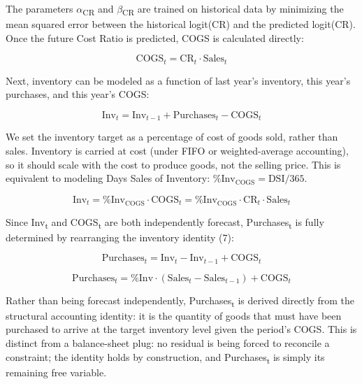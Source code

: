 \documentclass[12pt,a4paper]{article}
\begin{document}
The parameters $\alpha$\textsubscript{CR} and $\beta$\textsubscript{CR} are trained
on historical data by minimizing the mean squared error between the
historical logit(CR) and the predicted logit(CR). Once the future Cost
Ratio is predicted, COGS is calculated directly:

\begin{equation}\label{eq:cogs}
\text{COGS}_t = \text{CR}_t \cdot \text{Sales}_t
\end{equation}

Next, inventory can be modeled as a function of last year's inventory,
this year's purchases, and this year's COGS:

\begin{equation}\label{eq:inventory_rollforward}
\text{Inv}_t = \text{Inv}_{t-1} + \text{Purchases}_t - \text{COGS}_t
\end{equation}

We set the inventory target as a percentage of cost of goods sold, rather than sales. Inventory is carried at cost (under FIFO or weighted-average accounting), so it should scale with the cost to produce goods, not the selling price. This is equivalent to modeling Days Sales of Inventory: $\text{\%Inv}_{\text{COGS}} = \text{DSI} / 365$.

\begin{equation}\label{eq:inventory_target}
\text{Inv}_t = \text{\%Inv}_{\text{COGS}} \cdot \text{COGS}_t = \text{\%Inv}_{\text{COGS}} \cdot \text{CR}_t \cdot \text{Sales}_t
\end{equation}

Since Inv\textsubscript{t} and COGS\textsubscript{t} are both independently forecast, Purchases\textsubscript{t} is fully determined by rearranging the inventory identity (7):

\begin{equation}\label{eq:purchases}
\text{Purchases}_t = \text{Inv}_t - \text{Inv}_{t-1} + \text{COGS}_t
\end{equation}

\begin{equation}\label{eq:purchases_expanded}
\text{Purchases}_t = \text{\%Inv} \cdot (\text{Sales}_t - \text{Sales}_{t-1}) + \text{COGS}_t
\end{equation}

Rather than being forecast independently, Purchases\textsubscript{t} is derived directly from the structural accounting identity: it is the quantity of goods that must have been purchased to arrive at the target inventory level given the period's COGS. This is distinct from a balance-sheet plug: no residual is being forced to reconcile a constraint; the identity holds by construction, and Purchases\textsubscript{t}​ is simply its remaining free variable.
\end{document}
